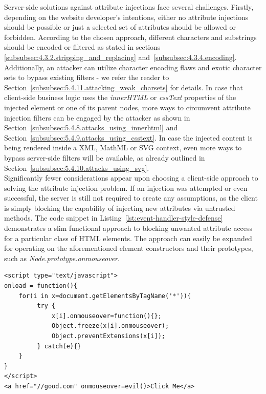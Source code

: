     Server-side solutions against attribute injections face several challenges. Firstly, depending on the website developer's intentions, either no attribute injections should be possible or just a selected set of attributes should be allowed or forbidden. According to the chosen approach, different characters and substrings should be encoded or filtered as stated in sections~ \ref{subsubsec:4.3.2.stripping_and_replacing} and~\ref{subsubsec:4.3.4.encoding}. Additionally, an attacker can utilize character encoding flaws and exotic character sets to bypass existing filters - we refer the reader to Section~\ref{subsubsec:5.4.11.attacking_weak_charsets} for details. In case that client-side business logic uses the \textit{innerHTML} or \textit{cssText} properties of the injected element or one of its parent nodes, more ways to circumvent attribute injection filters can be engaged by the attacker as shown in Section~\ref{subsubsec:5.4.8.attacks_using_innerhtml} and Section~\ref{subsubsec:5.4.9.attacks_using_csstext}. In case the injected content is being rendered inside a XML, MathML or SVG context, even more ways to bypass server-side filters will be available, as already outlined in Section~\ref{subsubsec:5.4.10.attacks_using_svg}. \\

     Significantly fewer considerations appear upon choosing a client-side approach to solving the attribute injection problem. If an injection was attempted or even successful, the server is still not required to create any assumptions, as the client is simply blocking the capability of injecting new attributes via untrusted methods. The code snippet in Listing~\ref{lst:event-handler-style-defense} demonstrates a slim functional approach to blocking unwanted attribute access for a particular class of HTML elements. The approach can easily be expanded for operating on the aforementioned element constructors and their prototypes, such as \textit{Node.prototype.onmouseover}. \\

\begin{lstlisting}[captionpos=b,label=lst:event-handler-style-defense,caption=Blocking unwanted event handler access in the client; the event handler is being overwritten\, then frozen and sealed]
<script type="text/javascript">
onload = function(){
    for(i in x=document.getElementsByTagName('*')){
         try {
             x[i].onmouseover=function(){};
             Object.freeze(x[i].onmouseover);
             Object.preventExtensions(x[i]);
         } catch(e){}
    }
}
</script>
<a href="//good.com" onmouseover=evil()>Click Me</a>
\end{lstlisting}  

